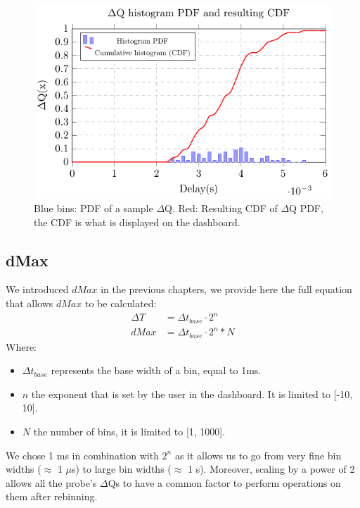     \begin{figure}[H]
            \begin{center}
                \includegraphics[scale=1]{tikz/pdf_dq.pdf} 
            \end{center}
            \caption{Blue bins: PDF of a sample $\Delta$Q. Red: Resulting CDF of $\Delta$Q PDF, the CDF is what is displayed on the dashboard.}
        \end{figure}

    \subsection{dMax}
        We introduced $dMax$ in the previous chapters, we provide here the full equation that allows $dMax$ to be calculated:
        \begin{equation}
            \begin{split}
                \Delta T &= \Delta t_{base} \cdot 2^n \\ 
                dMax &= \Delta t_{base} \cdot 2^n * N  
            \end{split}
            \label{eq:dMaxU}
        \end{equation}
        Where:
        \begin{itemize}
            \item $\Delta t_{base}$ represents the base width of a bin, equal to 1ms.
            \item $n$ the exponent that is set by the user in the dashboard. It is limited to [-10, 10].
            \item $N$ the number of bins, it is limited to [1, 1000].
        \end{itemize}
            We chose 1 ms in combination with $2^n$ as it allows us to go from very fine bin widths ($\approx$ 1 $\mu$s) to large bin widths ($\approx$ 1 s). Moreover, scaling by a power of 2 allows all the probe's $\Delta$Qs to have a common factor to perform operations on them after rebinning.

